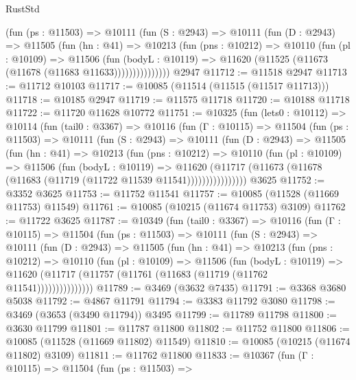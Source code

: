 \begin{lexlean}{RustStd}
\begin{coremodule}
            (fun (ps : @11503) =>
            @10111
              (fun (S : @2943) =>
              @10111
                (fun (D : @2943) =>
                @11505
                  (fun (hn : @41) =>
                  @10213
                    (fun (pns : @10212) =>
                    @10110
                      (fun (pl : @10109) =>
                      @11506
                        (fun (bodyL : @10119) =>
                        @11620 (@11525 (@11673 (@11678 (@11683 @11633)))))))))))))))
    @2947
@11712 := @11518 @2947
@11713 := @11712 @10103
@11717 := @10085 (@11514 (@11515 (@11517 @11713)))
@11718 := @10185 @2947
@11719 := @11575 @11718
@11720 := @10188 @11718
@11722 := @11720 @11628 @10772
@11751 := @10325
    (fun (lets0 : @10112) =>
    @10114
      (fun (tail0 : @3367) =>
      @10116
        (fun (Γ : @10115) =>
        @11504
          (fun (ps : @11503) =>
          @10111
            (fun (S : @2943) =>
            @10111
              (fun (D : @2943) =>
              @11505
                (fun (hn : @41) =>
                @10213
                  (fun (pns : @10212) =>
                  @10110
                    (fun (pl : @10109) =>
                    @11506
                      (fun (bodyL : @10119) =>
                      @11620
                        (@11717
                          (@11673 (@11678 (@11683 (@11719 (@11722 @11539 @11541))))))))))))))))
    @3625
@11752 := @3352 @3625
@11753 := @11752 @11541
@11757 := @10085 (@11528 (@11669 @11753) @11549)
@11761 := @10085 (@10215 (@11674 @11753) @3109)
@11762 := @11722 @3625
@11787 := @10349
    (fun (tail0 : @3367) =>
    @10116
      (fun (Γ : @10115) =>
      @11504
        (fun (ps : @11503) =>
        @10111
          (fun (S : @2943) =>
          @10111
            (fun (D : @2943) =>
            @11505
              (fun (hn : @41) =>
              @10213
                (fun (pns : @10212) =>
                @10110
                  (fun (pl : @10109) =>
                  @11506
                    (fun (bodyL : @10119) =>
                    @11620 (@11717 (@11757 (@11761 (@11683 (@11719 (@11762 @11541)))))))))))))))
@11789 := @3469 (@3632 @7435)
@11791 := @3368 @3680 @5038
@11792 := @4867 @11791
@11794 := @3383 @11792 @3080
@11798 := @3469 (@3653 (@3490 @11794)) @3495
@11799 := @11789 @11798
@11800 := @3630 @11799
@11801 := @11787 @11800
@11802 := @11752 @11800
@11806 := @10085 (@11528 (@11669 @11802) @11549)
@11810 := @10085 (@10215 (@11674 @11802) @3109)
@11811 := @11762 @11800
@11833 := @10367
    (fun (Γ : @10115) =>
    @11504
      (fun (ps : @11503) =>

\end{coremodule}
\end{lexlean}

